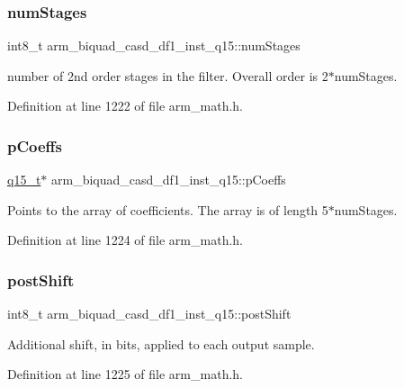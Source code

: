 \subsubsection{\texorpdfstring{num\+Stages}{numStages}}
{\footnotesize\ttfamily int8\+\_\+t arm\+\_\+biquad\+\_\+casd\+\_\+df1\+\_\+inst\+\_\+q15\+::num\+Stages}

number of 2nd order stages in the filter. Overall order is 2$\ast$num\+Stages. 

Definition at line 1222 of file arm\+\_\+math.\+h.

\mbox{\label{structarm__biquad__casd__df1__inst__q15_a1edaacdebb5b09d7635bf20c779855fc}} 
\subsubsection{\texorpdfstring{p\+Coeffs}{pCoeffs}}
{\footnotesize\ttfamily \hyperlink{arm__math_8h_ab5a8fb21a5b3b983d5f54f31614052ea}{q15\+\_\+t}$\ast$ arm\+\_\+biquad\+\_\+casd\+\_\+df1\+\_\+inst\+\_\+q15\+::p\+Coeffs}

Points to the array of coefficients. The array is of length 5$\ast$num\+Stages. 

Definition at line 1224 of file arm\+\_\+math.\+h.

\mbox{\label{structarm__biquad__casd__df1__inst__q15_ada7e9d6269e6ed4eacf8f68729e9832d}} 
\subsubsection{\texorpdfstring{post\+Shift}{postShift}}
{\footnotesize\ttfamily int8\+\_\+t arm\+\_\+biquad\+\_\+casd\+\_\+df1\+\_\+inst\+\_\+q15\+::post\+Shift}

Additional shift, in bits, applied to each output sample. 

Definition at line 1225 of file arm\+\_\+math.\+h.

